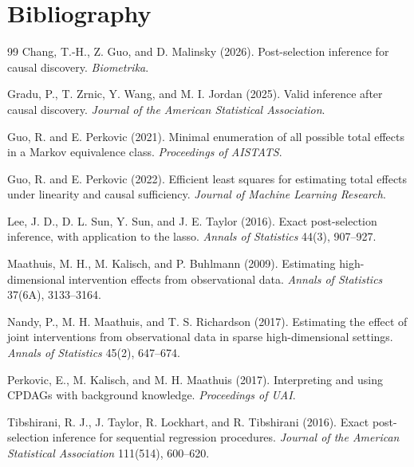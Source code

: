 \documentclass[11pt]{article}
\theoremstyle{definition}
\theoremstyle{plain}
\theoremstyle{remark}
\begin{document}
\section*{Bibliography}
\begin{thebibliography}{99}
Chang, T.-H., Z. Guo, and D. Malinsky (2026).
\newblock Post-selection inference for causal discovery.
\newblock \emph{Biometrika}.

Gradu, P., T. Zrnic, Y. Wang, and M. I. Jordan (2025).
\newblock Valid inference after causal discovery.
\newblock \emph{Journal of the American Statistical Association}.

Guo, R. and E. Perkovic (2021).
\newblock Minimal enumeration of all possible total effects in a Markov equivalence class.
\newblock \emph{Proceedings of AISTATS}.

Guo, R. and E. Perkovic (2022).
\newblock Efficient least squares for estimating total effects under linearity and causal sufficiency.
\newblock \emph{Journal of Machine Learning Research}.

Lee, J. D., D. L. Sun, Y. Sun, and J. E. Taylor (2016).
\newblock Exact post-selection inference, with application to the lasso.
\newblock \emph{Annals of Statistics} 44(3), 907--927.

Maathuis, M. H., M. Kalisch, and P. Buhlmann (2009).
\newblock Estimating high-dimensional intervention effects from observational data.
\newblock \emph{Annals of Statistics} 37(6A), 3133--3164.

Nandy, P., M. H. Maathuis, and T. S. Richardson (2017).
\newblock Estimating the effect of joint interventions from observational data in sparse high-dimensional settings.
\newblock \emph{Annals of Statistics} 45(2), 647--674.

Perkovic, E., M. Kalisch, and M. H. Maathuis (2017).
\newblock Interpreting and using CPDAGs with background knowledge.
\newblock \emph{Proceedings of UAI}.

Tibshirani, R. J., J. Taylor, R. Lockhart, and R. Tibshirani (2016).
\newblock Exact post-selection inference for sequential regression procedures.
\newblock \emph{Journal of the American Statistical Association} 111(514), 600--620.
\end{thebibliography}
\end{document}
